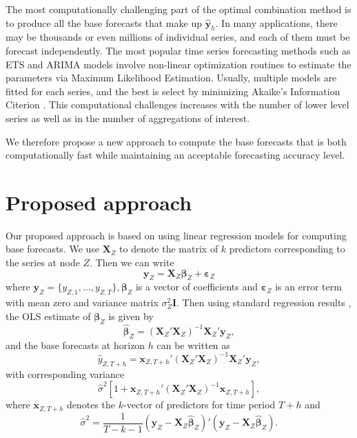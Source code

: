 \documentclass[11pt,a4paper,]{article}
\begin{document}
The most computationally challenging part of the optimal combination method is to produce all the base forecasts that make up \(\hat{\bm{y}}_h\). In many applications, there may be thousands or even millions of individual series, and each of them must be forecast independently. The most popular time series forecasting methods such as ETS and ARIMA models \autocite{fpp2} involve non-linear optimization routines to estimate the parameters via Maximum Likelihood Estimation. Usually, multiple models are fitted for each series, and the best is select by minimizing Akaike's Information Citerion \autocite{akaike1998information}. This computational challenges increases with the number of lower level series as well as in the number of aggregations of interest.

We therefore propose a new approach to compute the base forecasts that is both computationally fast while maintaining an acceptable forecasting accuracy level.

\hypertarget{proposed-approach}{%
\section{Proposed approach}\label{proposed-approach}}

Our proposed approach is based on using linear regression models for computing base forecasts. We use \(\bm{X}_{Z}\) to denote the matrix of \(k\) predictors corresponding to the series at node \(Z\). Then we can write
\begin{equation}\label{eq:linearmodel}
  \bm{y}_Z = \bm{X}_Z \bm{\beta}_Z+\bm{\varepsilon}_Z
\end{equation}
where \(\bm{y}_Z = \{y_{Z,1},\dots,y_{Z,T}\}, \bm{\beta}_Z\) is a vector of coefficients and \(\bm{\varepsilon}_Z\) is an error term with mean zero and variance matrix \(\sigma^2_Z\bm{I}\). Then using standard regression results \autocite{SeberLee}, the OLS estimate of \(\bm{\beta}_Z\) is given by
\begin{equation}\label{eq:linearcoefficientstwosteps}
  \hat{\bm{\beta}}_Z = (\bm{X}_{Z}'\bm{X}_Z)^{-1}\bm{X}_Z'\bm{y}_Z,
\end{equation}
and the base forecasts at horizon \(h\) can be written as
\begin{equation}
  \hat{y}_{Z,T+h} = \bm{x}_{Z,T+h}'(\bm{X}_{Z}'\bm{X}_Z)^{-1}\bm{X}_Z'\bm{y}_Z,
\end{equation}
with corresponding variance
\[
\hat\sigma^2\left[1 + \bm{x}_{Z,T+h}'(\bm{X}_{Z}'\bm{X}_Z)^{-1}\bm{x}_{Z,T+h}\right],
\]
where \(\bm{x}_{Z,T+h}\) denotes the \(k\)-vector of predictors for time period \(T+h\) and
\[
\hat\sigma^2 = \frac{1}{T-k-1}(\bm{y}_Z - \bm{X}_Z\hat{\bm{\beta}}_Z)'(\bm{y}_Z - \bm{X}_Z\hat{\bm{\beta}}_Z).
\]
\end{document}
